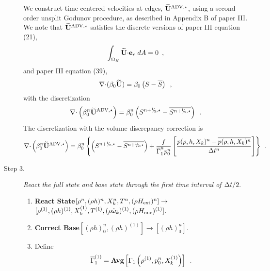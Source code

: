 \begin{description}
We construct time-centered velocities at edges, $\widetilde{\mathbf{U}}^{\mathrm{ADV},\star}$, 
using a second-order unsplit Godunov procedure, as described
in Appendix B of paper III.  We note that  $\widetilde{\mathbf{U}}^{\mathrm{ADV},\star}$ satisfies 
the discrete versions of paper III equation (21),
\begin{equation}
\int_{\Omega_H} \widetilde{{\bf U}} \mathbf{\cdot} \mathbf{e}_r \; dA = 0 \label{eq:udoterzero} \enskip ,
\end{equation}
and paper III equation (39),
\begin{equation}
\mathbf{\nabla} \mathbf{\cdot} (\beta_0 \widetilde{{\bf U}} )  = \beta_0 \left(S - \overline{S} \right )\enskip ,
\label{eq:tildeconstraint}
\end{equation}
with the discretization
\begin{equation}
\nablab \cdotb \left(\beta_0^n \uadvone\right) = 
\beta_0^n \left(S^{\nph,\star} - \overline{S^{\nph,\star}}\right) \enskip .
\end{equation}
The discretization with the volume discrepancy correction is
\begin{equation}
\nablab \cdotb \left(\beta_0^n \uadvone\right) = 
\beta_0^n \left\{ \left(S^{\nph,\star} - \overline{S^{\nph,\star}}\right)
+ \frac{f}{\gammabar^n p_0^n}
\left[\frac{p(\rho,h,X_k)^n - \overline{p(\rho,h,X_k)^n}}{\Delta t^n}\right]\right\} \enskip .
\end{equation}

\item[Step 3.] {\em React the full state and base state through the first time 
interval of $\Delta t / 2.$}

\begin{enumerate}
\renewcommand{\theenumi}{{\bf \alph{enumi}}}

\item {\bf React State}$[\rho^n, (\rho h)^n, X_k^n, T^n, (\rho{H_{\rm ext}})^n]
                   \rightarrow$ $[ \rho^{(1)}, (\rho h)^{(1)}, X_k^{(1)}, T^{(1)},
                                  (\rho \dot{\omega}_k)^{(1)}, (\rho {H_{\rm nuc}})^{(1)} ].$

\item {\bf Correct Base}$[(\rho h)_0^{n},(\rho h)^{(1)}] \rightarrow [(\rho h)_0^{n}]$.

\item Define
\begin{equation}
\overline{\Gamma}_1^{(1)} = {\rm{\bf Avg}} \left[ \Gamma_1\left(\rho^{(1)}, p_0^{n}, X_k^{(1)}\right) \right] \enskip .
\end{equation}


\end{enumerate}
\end{description}
